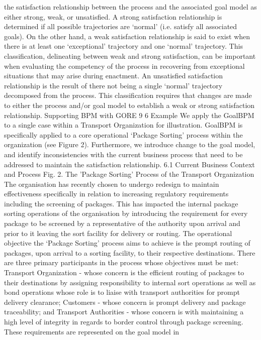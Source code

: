 the satisfaction relationship between the process and the associated goal model
as either strong, weak, or unsatisfied. A strong satisfaction relationship is determined if all possible trajectories are ‘normal’ (i.e. satisfy all associated goals).
On the other hand, a weak satisfaction relationship is said to exist when there is
at least one ‘exceptional’ trajectory and one ‘normal’ trajectory. This classification, delineating between weak and strong satisfaction, can be important when
evaluating the competency of the process in recovering from exceptional situations that may arise during enactment. An unsatisfied satisfaction relationship
is the result of there not being a single ‘normal’ trajectory decomposed from the
process. This classification requires that changes are made to either the process
and/or goal model to establish a weak or strong satisfaction relationship.
Supporting BPM with GORE 9
6 Example
We apply the GoalBPM to a single case within a Transport Organization for
illustration. GoalBPM is specifically applied to a core operational ‘Package Sorting’ process within the organization (see Figure 2). Furthermore, we introduce
change to the goal model, and identify inconsistencies with the current business
process that need to be addressed to maintain the satisfaction relationship.
6.1 Current Business Context and Process
Fig. 2. The ’Package Sorting’ Process of the Transport Organization
The organisation has recently chosen to undergo redesign to maintain effectiveness specifically in relation to increasing regulatory requirements including
the screening of packages. This has impacted the internal package sorting operations of the organisation by introducing the requirement for every package to be
screened by a representative of the authority upon arrival and prior to it leaving
the sort facility for delivery or routing.
The operational objective the ‘Package Sorting’ process aims to achieve is
the prompt routing of packages, upon arrival to a sorting facility, to their respective destinations. There are three primary participants in the process whose
objectives must be met: Transport Organization - whose concern is the efficient
routing of packages to their destinations by assigning responsibility to internal
sort operations as well as bond operations whose role is to liaise with transport
authorities for prompt delivery clearance; Customers - whose concern is prompt
delivery and package traceability; and Transport Authorities - whose concern is
with maintaining a high level of integrity in regards to border control through
package screening. These requirements are represented on the goal model in
